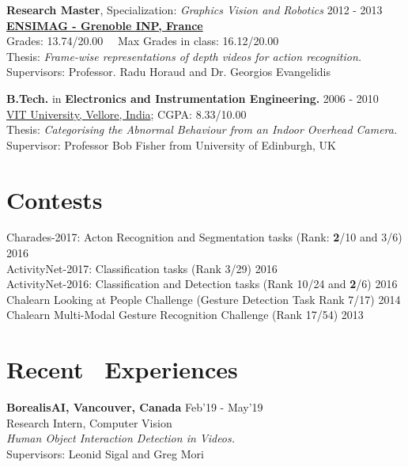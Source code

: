 \documentclass[line, margin]{res}
\begin{document}
\begin{resume}
\textbf{Research Master}, Specialization: \emph{Graphics Vision and Robotics} \hfill 2012 - 2013\\
\href{http://ensimag.grenoble-inp.fr/}{\textbf{ENSIMAG - Grenoble INP, France}}\\
Grades: 13.74/20.00  \  \ Max Grades in class: 16.12/20.00\\
Thesis: \emph{Frame-wise representations of depth videos for action recognition.} 
Supervisors: Professor. Radu Horaud and Dr. Georgios Evangelidis

\textbf{B.Tech.} in \textbf{Electronics and Instrumentation Engineering.} \hfill 2006 - 2010\\
\href{http://www.vit.ac.in/}{VIT University, Vellore, India}; 
CGPA: 8.33/10.00 \\%
Thesis: 
\emph{Categorising the Abnormal Behaviour from an Indoor Overhead Camera.}\\
Supervisor: %
{Professor Bob Fisher} from University of Edinburgh, UK

\section{Contests}
Charades-2017: Acton Recognition and Segmentation tasks (Rank: \textbf{2}/10 and 3/6) \hfill 2016\\
ActivityNet-2017: Classification tasks (Rank 3/29)  \hfill 2016\\
ActivityNet-2016: Classification and Detection tasks (Rank 10/24 and \textbf{2}/6) \hfill 2016\\
Chalearn Looking at People Challenge (Gesture Detection Task Rank 7/17) \hfill 2014\\
Chalearn Multi-Modal Gesture Recognition Challenge (Rank 17/54) \hfill 2013

\section{Recent \ Experiences}
\textbf{BorealisAI, Vancouver, Canada} \hfill Feb'19 - May'19 \\
Research Intern, Computer Vision\\
\emph{Human Object Interaction Detection in Videos.}\\
Supervisors: Leonid Sigal and Greg Mori 


\end{resume}
\end{document}
